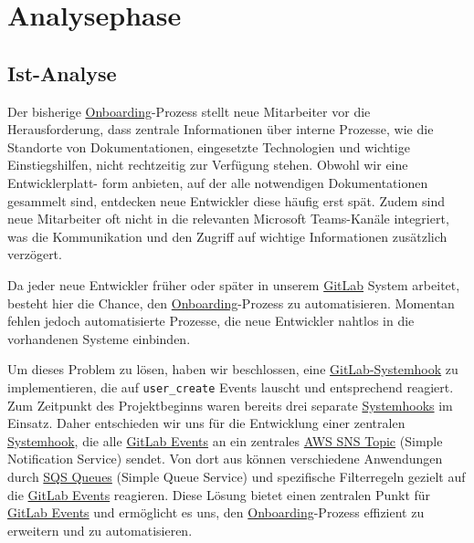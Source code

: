 
\section{Analysephase}
\label{sec:Analysephase}

\subsection{Ist-Analyse}
\label{sec:IstAnalyse}

Der bisherige \hyperlink{Onboarding}{\textcolor{AOBlau}{Onboarding}}-Prozess stellt neue Mitarbeiter vor die Herausforderung, dass zentrale Informationen über interne Prozesse, wie die Standorte von Dokumentationen, eingesetzte Technologien und wichtige Einstiegshilfen, nicht rechtzeitig zur Verfügung stehen. Obwohl wir eine Entwicklerplatt-
form anbieten, auf der alle notwendigen Dokumentationen gesammelt sind, entdecken neue Entwickler diese häufig erst spät. Zudem sind neue Mitarbeiter oft nicht in die relevanten Microsoft Teams-Kanäle integriert, was die Kommunikation und den Zugriff auf wichtige Informationen zusätzlich verzögert.

Da jeder neue Entwickler früher oder später in unserem \hyperlink{GitLab}{\textcolor{AOBlau}{GitLab}} System arbeitet, besteht hier die Chance, den \hyperlink{Onboarding}{\textcolor{AOBlau}{Onboarding}}-Prozess zu automatisieren. Momentan fehlen jedoch automatisierte Prozesse, die neue Entwickler nahtlos in die vorhandenen Systeme einbinden.

Um dieses Problem zu lösen, haben wir beschlossen, eine \hyperlink{GitLabSystemhooks}{\textcolor{AOBlau}{GitLab-Systemhook}} zu implementieren, die auf \texttt{user\_create} Events lauscht und entsprechend reagiert. Zum Zeitpunkt des Projektbeginns waren bereits drei separate \hyperlink{GitLabSystemhooks}{\textcolor{AOBlau}{Systemhooks}} im Einsatz. Daher entschieden wir uns für die Entwicklung einer zentralen \hyperlink{GitLabSystemhooks}{\textcolor{AOBlau}{Systemhook}}, die alle \hyperlink{GitLabEvent}{\textcolor{AOBlau}{GitLab Events}} an ein zentrales \hyperlink{SNS}{\textcolor{AOBlau}{AWS SNS Topic}} (Simple Notification Service) sendet. Von dort aus können verschiedene Anwendungen durch \hyperlink{SQS}{\textcolor{AOBlau}{SQS Queues}} (Simple Queue Service) und spezifische Filterregeln gezielt auf die \hyperlink{GitLabEvent}{\textcolor{AOBlau}{GitLab Events}} reagieren. Diese Lösung bietet einen zentralen Punkt für \hyperlink{GitLabEvent}{\textcolor{AOBlau}{GitLab Events}} und ermöglicht es uns, den \hyperlink{Onboarding}{\textcolor{AOBlau}{Onboarding}}-Prozess effizient zu erweitern und zu automatisieren.


